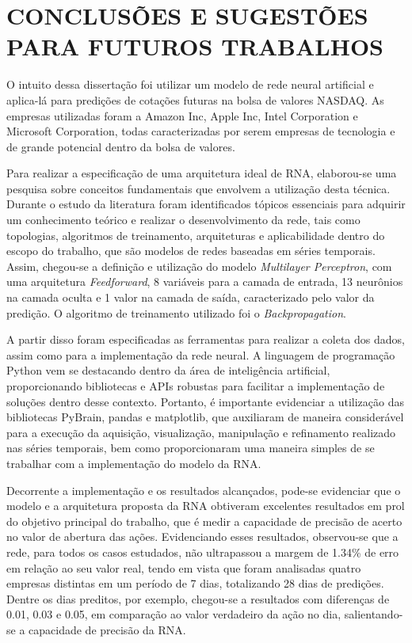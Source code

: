 
\chapter{CONCLUSÕES E SUGESTÕES PARA FUTUROS TRABALHOS}\label{ch:conclusao}
O intuito dessa dissertação foi utilizar um modelo de rede neural artificial e aplica-lá para predições de cotações futuras na bolsa de valores NASDAQ. As empresas utilizadas foram a Amazon Inc, Apple Inc, Intel Corporation e Microsoft Corporation, todas caracterizadas por serem empresas de tecnologia e de grande potencial dentro da bolsa de valores.

Para realizar a especificação de uma arquitetura ideal de RNA, elaborou-se uma pesquisa sobre conceitos fundamentais que envolvem a utilização desta técnica. Durante o estudo da literatura foram identificados tópicos essenciais para adquirir um conhecimento teórico e realizar o desenvolvimento da rede, tais como topologias, algoritmos de treinamento, arquiteturas e aplicabilidade dentro do escopo do trabalho, que são modelos de redes baseadas em séries temporais. Assim, chegou-se a definição e utilização do modelo \textit{Multilayer Perceptron}, com uma arquitetura \textit{Feedforward}, 8 variáveis para a camada de entrada, 13 neurônios na camada oculta e 1 valor na camada de saída, caracterizado pelo valor da predição. O algoritmo de treinamento utilizado foi o \textit{Backpropagation}. 

A partir disso foram especificadas as ferramentas para realizar a coleta dos dados, assim como para a implementação da rede neural. A linguagem de programação Python vem se destacando dentro da área de inteligência artificial, proporcionando bibliotecas e APIs robustas para facilitar a implementação de soluções dentro desse contexto. Portanto, é importante evidenciar a utilização das bibliotecas PyBrain, pandas e matplotlib, que auxiliaram de maneira considerável para a execução da aquisição, visualização, manipulação e refinamento realizado nas séries temporais, bem como proporcionaram uma maneira simples de se trabalhar com a implementação do modelo da RNA.

Decorrente a implementação e os resultados alcançados, pode-se evidenciar que o modelo e a arquitetura proposta da RNA obtiveram excelentes resultados em prol do objetivo principal do trabalho, que é medir a capacidade de precisão de acerto no valor de abertura das ações. Evidenciando esses resultados, observou-se que a rede, para todos os casos estudados, não ultrapassou a margem de 1.34\% de erro em relação ao seu valor real, tendo em vista que foram analisadas quatro empresas distintas em um período de 7 dias, totalizando 28 dias de predições. Dentre os dias preditos, por exemplo, chegou-se a resultados com diferenças de 0.01, 0.03 e 0.05, em comparação ao valor verdadeiro da ação no dia, salientando-se a capacidade de precisão da RNA. 

